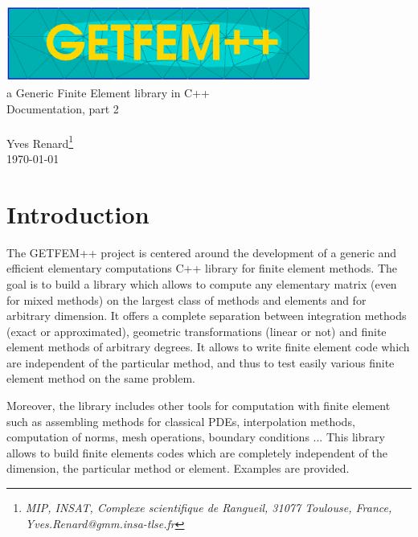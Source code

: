 \documentclass[11pt,a4paper]{article}
\begin{document}
\begin{center}
  \includegraphics[width=10cm,angle=0]{getfemlogo.eps}\\[0.2cm]
  a Generic Finite Element library in C++ \\[0.5cm]
  {\LARGE Documentation, part \Huge 2} \\[0.5cm]
   \\[0.5cm]
  { \large Yves \sc Renard\footnote{ \it MIP, INSAT, Complexe scientifique de Rangueil, 31077 Toulouse, France, Yves.Renard@gmm.insa-tlse.fr } } \\[1.0cm]
  \today \\[1.0cm]
\end{center}




\section*{Introduction}


The GETFEM++ project is centered around the development of a generic and efficient elementary computations C++ library for finite element methods. The goal is to build a library which allows to compute any elementary matrix (even for mixed methods) on the largest class of methods and elements and for arbitrary dimension. It offers a complete separation between integration methods (exact or approximated), geometric transformations (linear or not) and finite element methods of arbitrary degrees. It allows to write finite element code which are independent of the particular method, and thus to test easily various finite element method on the same problem.

 Moreover, the library includes other tools for computation with finite element such as assembling methods for classical PDEs, interpolation methods, computation of norms, mesh operations, boundary conditions ... This library allows to build finite elements codes which are completely independent of the dimension, the particular method or element. Examples are provided.\\[2cm]

\end{document}
